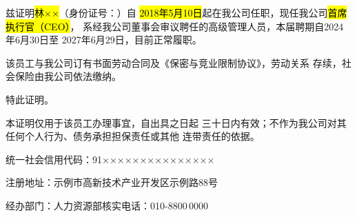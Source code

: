 \documentclass[zihao=-4]{ctexart}
\begin{document}

兹证明\hl{林××}（身份证号：）自
\hl{2018年5月10日}起在我公司任职，现任我公司\hl{首席执行官（CEO）}，
系经我公司董事会审议聘任的高级管理人员，本届聘期自2024年6月30日至
2027年6月29日，目前正常履职。

该员工与我公司订有书面劳动合同及《保密与竞业限制协议》，劳动关系
存续，社会保险由我公司依法缴纳。

特此证明。

本证明仅用于该员工办理事宜，自出具之日起
三十日内有效；不作为我公司对其任何个人行为、债务承担担保责任或其他
连带责任的依据。

\vspace{2\baselineskip}
\edSeal
{}

\vspace{1\baselineskip}
{\noindent 统一社会信用代码：91×××××××××××××××\par}
{\noindent 注册地址：示例市高新技术产业开发区示例路88号\par}
{\noindent 经办部门：人力资源部\quad 核实电话：010-8800\,0000\par}
\end{document}
